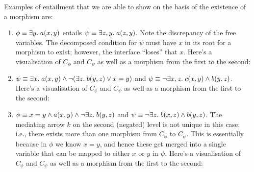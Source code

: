 Examples of entailment that we are able to show on the basis of the existence of a morphism are:
%
\begin{enumerate}
\item{} $\phi\equiv \exists y.\; a(x,y)$ entails $\psi\equiv \exists z,y.\; a(z,y)$. Note the discrepancy of the free variables. The decomposed condition for $\psi$ must have $x$ in its root for a morphism to exist; however, the interface ``loses'' that $x$. Here's a visualisation of $C_\phi$ and $C_\psi$ as well as a morphism from the first to the second:

  \begin{center}
    
  \end{center}
  
  \item{} $\psi\equiv \exists x.\; a(x,y) \wedge \neg (\exists z.\; b(y,z) \vee x=y)$ and $\psi\equiv \neg \exists x,z.\; c(x,y)\wedge b(y,z)$. Here's a visualisation of $C_\phi$ and $C_\psi$ as well as a morphism from the first to the second:
  
    

  \item{} $\phi\equiv x=y\wedge a(x,y)\wedge \neg \exists z.\; b(y,z)$ and $\psi\equiv \neg\exists z.\; b(x,z)\wedge b(y,z)$. The mediating arrow $k$ on the second (negated) level is not unique in this case; i.e., there exists more than one morphism from $C_\phi$ to $C_\psi$. This is essentially because in $\phi$ we know $x=y$, and hence these get merged into a single variable that can be mapped to either $x$ or $y$ in $\psi$. Here's a visualisation of $C_\phi$ and $C_\psi$ as well as a morphism from the first to the second:
  

\end{enumerate}
